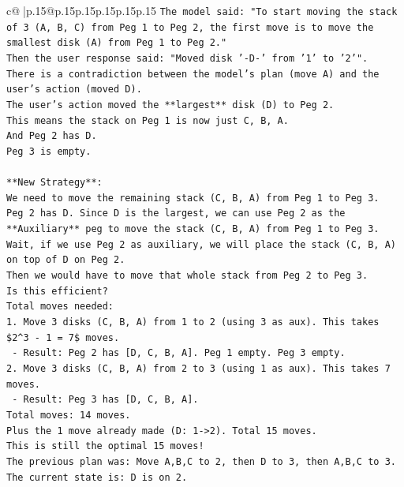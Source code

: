 \documentclass{article}
\begin{document}
{\begin{supertabular}{c@{$\;$}|p{.15\linewidth}@{}p{.15\linewidth}p{.15\linewidth}p{.15\linewidth}p{.15\linewidth}p{.15\linewidth}}
{{{\texttt{The model said: "To start moving the stack of 3 (A, B, C) from Peg 1 to Peg 2, the first move is to move the smallest disk (A) from Peg 1 to Peg 2."} \\
\texttt{Then the user response said: "Moved disk '{-}D{-}' from '1' to '2'".} \\
\texttt{There is a contradiction between the model's plan (move A) and the user's action (moved D).} \\
\texttt{The user's action moved the **largest** disk (D) to Peg 2.} \\
\texttt{This means the stack on Peg 1 is now just C, B, A.} \\
\texttt{And Peg 2 has D.} \\
\texttt{Peg 3 is empty.} \\
\\ 
\texttt{**New Strategy**:} \\
\texttt{We need to move the remaining stack (C, B, A) from Peg 1 to Peg 3.} \\
\texttt{Peg 2 has D. Since D is the largest, we can use Peg 2 as the **Auxiliary** peg to move the stack (C, B, A) from Peg 1 to Peg 3.} \\
\texttt{Wait, if we use Peg 2 as auxiliary, we will place the stack (C, B, A) on top of D on Peg 2.} \\
\texttt{Then we would have to move that whole stack from Peg 2 to Peg 3.} \\
\texttt{Is this efficient?} \\
\texttt{Total moves needed:} \\
\texttt{1. Move 3 disks (C, B, A) from 1 to 2 (using 3 as aux). This takes \$2\^{}3 {-} 1 = 7\$ moves.} \\
\texttt{   {-} Result: Peg 2 has {[}D, C, B, A{]}. Peg 1 empty. Peg 3 empty.} \\
\texttt{2. Move 3 disks (C, B, A) from 2 to 3 (using 1 as aux). This takes 7 moves.} \\
\texttt{   {-} Result: Peg 3 has {[}D, C, B, A{]}.} \\
\texttt{Total moves: 14 moves.} \\
\texttt{Plus the 1 move already made (D: 1{-}>2). Total 15 moves.} \\
\texttt{This is still the optimal 15 moves!} \\
\texttt{The previous plan was: Move A,B,C to 2, then D to 3, then A,B,C to 3.} \\
\texttt{The current state is: D is on 2.} \\
}}}
\end{supertabular}}
\end{document}
